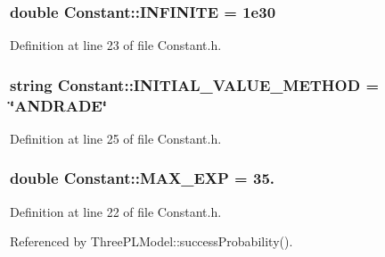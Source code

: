 \subsubsection[{I\+N\+F\+I\+N\+I\+T\+E}]{\setlength{\rightskip}{0pt plus 5cm}double Constant\+::\+I\+N\+F\+I\+N\+I\+T\+E = 1e30\hspace{0.3cm}{\ttfamily [static]}}\label{classConstant_a37bff4b53634ef172c8d87eded8d29bf}


Definition at line 23 of file Constant.\+h.

\hypertarget{classConstant_ae499a37885b6c873530a91243fd04bdf}{}
\subsubsection[{I\+N\+I\+T\+I\+A\+L\+\_\+\+V\+A\+L\+U\+E\+\_\+\+M\+E\+T\+H\+O\+D}]{\setlength{\rightskip}{0pt plus 5cm}string Constant\+::\+I\+N\+I\+T\+I\+A\+L\+\_\+\+V\+A\+L\+U\+E\+\_\+\+M\+E\+T\+H\+O\+D = \char`\"{}A\+N\+D\+R\+A\+D\+E\char`\"{}\hspace{0.3cm}{\ttfamily [static]}}\label{classConstant_ae499a37885b6c873530a91243fd04bdf}


Definition at line 25 of file Constant.\+h.

\hypertarget{classConstant_ae5c89860fb1308141f626ba360825f88}{}
\subsubsection[{M\+A\+X\+\_\+\+E\+X\+P}]{\setlength{\rightskip}{0pt plus 5cm}double Constant\+::\+M\+A\+X\+\_\+\+E\+X\+P = 35.\hspace{0.3cm}{\ttfamily [static]}}\label{classConstant_ae5c89860fb1308141f626ba360825f88}


Definition at line 22 of file Constant.\+h.



Referenced by Three\+P\+L\+Model\+::success\+Probability().

\hypertarget{classConstant_aaf334273fc82a586936f00df7ec30149}{}
